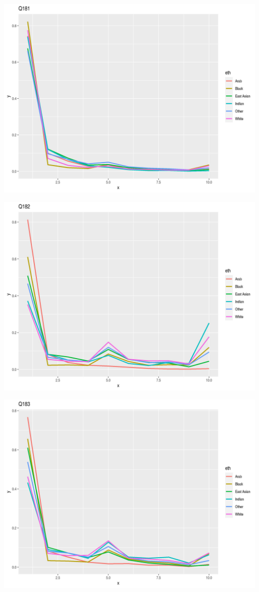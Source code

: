 \documentclass{amsart}
\begin{document}
\includegraphics[scale=0.7]{q181.jpeg}

\includegraphics[scale=0.7]{q182.jpeg}

\includegraphics[scale=0.7]{q183.jpeg}
\end{document}
